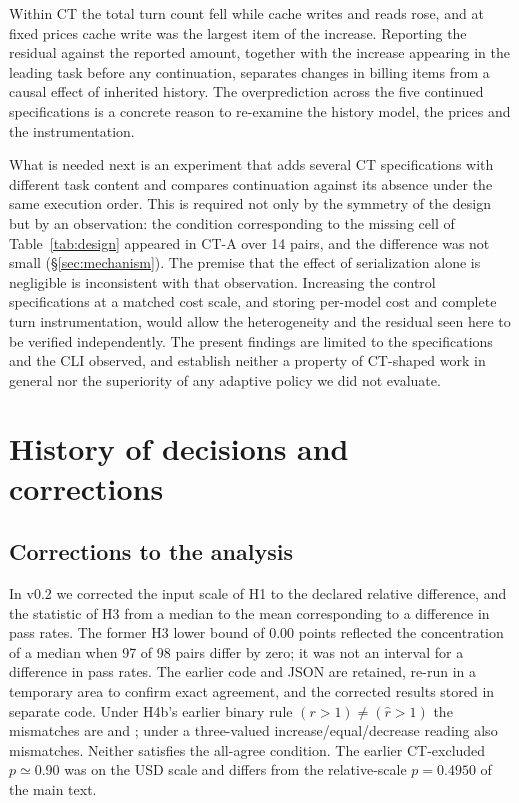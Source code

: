 \documentclass[a4paper,11pt]{article}
\newcommand{\spec}[1]{\texttt{\detokenize{#1}}}
\begin{document}
Within CT the total turn count fell while cache writes and reads rose, and at fixed prices cache write was the largest item of the increase. Reporting the residual against the reported amount, together with the increase appearing in the leading task before any continuation, separates changes in billing items from a causal effect of inherited history. The overprediction across the five continued specifications is a concrete reason to re-examine the history model, the prices and the instrumentation.

What is needed next is an experiment that adds several CT specifications with different task content and compares continuation against its absence under the same execution order. This is required not only by the symmetry of the design but by an observation: the condition corresponding to the missing cell of Table~\ref{tab:design} appeared in CT-A over 14 pairs, and the difference was not small (\S\ref{sec:mechanism}). The premise that the effect of serialization alone is negligible is inconsistent with that observation. Increasing the control specifications at a matched cost scale, and storing per-model cost and complete turn instrumentation, would allow the heterogeneity and the residual seen here to be verified independently. The present findings are limited to the specifications and the CLI observed, and establish neither a property of CT-shaped work in general nor the superiority of any adaptive policy we did not evaluate.

\appendix
\section{History of decisions and corrections}\label{app:correction}
\subsection{Corrections to the analysis}
In v0.2 we corrected the input scale of H1 to the declared relative difference, and the statistic of H3 from a median to the mean corresponding to a difference in pass rates. The former H3 lower bound of 0.00 points reflected the concentration of a median when 97 of 98 pairs differ by zero; it was not an interval for a difference in pass rates. The earlier code and JSON are retained, re-run in a temporary area to confirm exact agreement, and the corrected results stored in separate code. Under H4b's earlier binary rule $(r>1)\ne(\widehat r>1)$ the mismatches are \spec{n_db_chain} and \spec{w_two_files}; under a three-valued increase/equal/decrease reading \spec{s17_w_two_files} also mismatches. Neither satisfies the all-agree condition. The earlier CT-excluded $p\simeq0.90$ was on the USD scale and differs from the relative-scale $p=0.4950$ of the main text.
\end{document}
